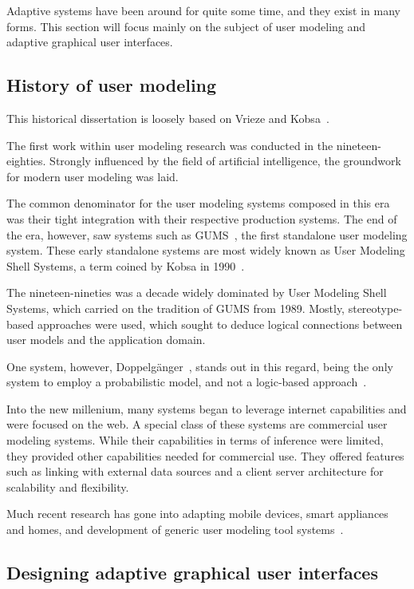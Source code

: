  Adaptive systems have been around for quite some time, and they exist in many forms. This section will focus mainly on the subject of user modeling and adaptive graphical user interfaces.

  \subsection{History of user modeling}

    This historical dissertation is loosely based on Vrieze and Kobsa~\cite{Vrieze,Kobsa2001}.

    The first work within user modeling research was conducted in the nineteen-eighties. Strongly influenced by the field of artificial intelligence, the groundwork for modern user modeling was laid.

    The common denominator for the user modeling systems composed in this era was their tight integration with their respective production systems. The end of the era, however, saw systems such as GUMS~\cite{Finin1989}, the first standalone user modeling system. These early standalone systems are most widely known as User Modeling Shell Systems, a term coined by Kobsa in 1990~\cite{Kobsa1990}.

    The nineteen-nineties was a decade widely dominated by User Modeling Shell Systems, which carried on the tradition of GUMS from 1989. Mostly, stereotype-based approaches were used, which sought to deduce logical connections between user models and the application domain.

    One system, however, Doppelgänger~\cite{Orwant1995}, stands out in this regard, being the only system to employ a probabilistic model, and not a logic-based approach~\cite{Kobsa2001,Pohl1997,Pohl1999}.

    Into the new millenium, many systems began to leverage internet capabilities and were focused on the web. A special class of these systems are commercial user modeling systems. While their capabilities in terms of inference were limited, they provided other capabilities needed for commercial use. They offered features such as linking with external data sources and a client server architecture for scalability and flexibility.

    Much recent research has gone into adapting mobile devices, smart appliances and homes, and development of generic user modeling tool systems~\cite{Vrieze,Gajos2006,Findlater2008}.

  \subsection{Designing adaptive graphical user interfaces}

